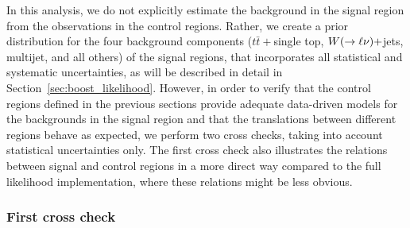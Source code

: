 
In this analysis, we do not explicitly estimate the background in the signal region from the
observations in the control regions. Rather, we create a prior distribution for the four background
components ($t\bar{t}+$single top, $W(\rightarrow \ell\nu)+$jets, multijet,
and all others) of the signal regions, that incorporates all statistical and systematic
uncertainties, as
will be described in detail in Section~\ref{sec:boost_likelihood}. 
However, in order to verify that the control regions defined in the previous sections provide
adequate data-driven models for the backgrounds in the signal region and that the translations
between different regions behave as expected, we perform two cross checks, taking into account
statistical uncertainties only. 
The first cross check also illustrates the relations between signal and control regions in a more
direct way compared to the full likelihood implementation, where these relations might be less
obvious. 

\subsubsection{First cross check}

